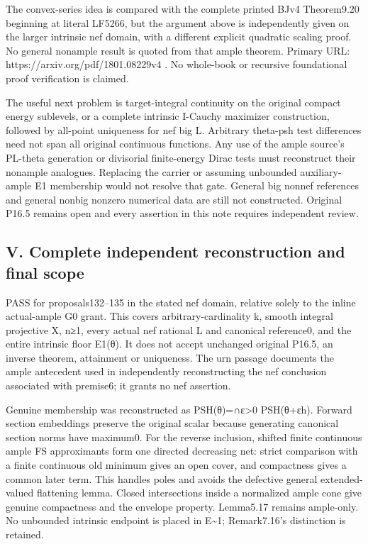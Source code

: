 \documentclass[
  10pt,
]{article}
\begin{document}
The convex-series idea is compared with the complete printed BJv4
Theorem9.20 beginning at literal LF5266, but the argument above is
independently given on the larger intrinsic nef domain, with a different
explicit quadratic scaling proof. No general nonample result is quoted
from that ample theorem. Primary URL: https://arxiv.org/pdf/1801.08229v4
. No whole-book or recursive foundational proof verification is claimed.

The useful next problem is target-integral continuity on the original
compact energy sublevels, or a complete intrinsic I-Cauchy maximizer
construction, followed by all-point uniqueness for nef big L. Arbitrary
theta-psh test differences need not span all original continuous
functions. Any use of the ample source's PL-theta generation or
divisorial finite-energy Dirac tests must reconstruct their nonample
analogues. Replacing the carrier or assuming unbounded auxiliary-ample
E1 membership would not resolve that gate. General big nonnef references
and general nonbig nonzero numerical data are still not constructed.
Original P16.5 remains open and every assertion in this note requires
independent review.

\subsection{V. Complete independent reconstruction and final
scope}\label{v.-complete-independent-reconstruction-and-final-scope}

PASS for proposals132--135 in the stated nef domain, relative solely to
the inline actual-ample G0 grant. This covers arbitrary-cardinality k,
smooth integral projective X, n≥1, every actual nef rational L and
canonical reference0, and the entire intrinsic floor E1(θ). It does not
accept unchanged original P16.5, an inverse theorem, attainment or
uniqueness. The urn passage documents the ample antecedent used in
independently reconstructing the nef conclusion associated with
premise6; it grants no nef assertion.

Genuine membership was reconstructed as PSH(θ)=∩ε\textgreater0
PSH(θ+εh). Forward section embeddings preserve the original scalar
because generating canonical section norms have maximum0. For the
reverse inclusion, shifted finite continuous ample FS approximants form
one directed decreasing net: strict comparison with a finite continuous
old minimum gives an open cover, and compactness gives a common later
term. This handles poles and avoids the defective general
extended-valued flattening lemma. Closed intersections inside a
normalized ample cone give genuine compactness and the envelope
property. Lemma5.17 remains ample-only. No unbounded intrinsic endpoint
is placed in E\textasciitilde1; Remark7.16's distinction is retained.
\end{document}
